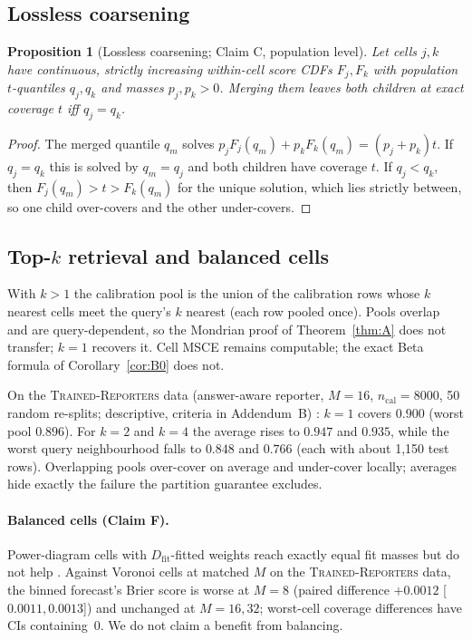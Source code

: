\documentclass[11pt]{article}
\newtheorem{proposition}[theorem]{Proposition}
\theoremstyle{definition}
\theoremstyle{remark}
\newcommand{\Dfit}{D_{\mathrm{fit}}}
\newcommand{\1}{\mathbf{1}}
\newcommand{\expname}[1]{\textsc{#1}}
\begin{document}
\subsection{Lossless coarsening}
\begin{proposition}[Lossless coarsening; Claim C, population level]
\label{prop:C}
Let cells $j,k$ have continuous, strictly increasing within-cell score CDFs $F_j,F_k$ with
population $t$-quantiles $q_j,q_k$ and masses $p_j,p_k>0$. Merging them leaves both
children at exact coverage $t$ iff $q_j=q_k$.
\end{proposition}
\begin{proof}
The merged quantile $q_m$ solves $p_jF_j(q_m)+p_kF_k(q_m)=(p_j+p_k)t$. If $q_j=q_k$ this
is solved by $q_m=q_j$ and both children have coverage $t$. If $q_j<q_k$, then
$F_j(q_m)>t>F_k(q_m)$ for the unique solution, which lies strictly between, so one child
over-covers and the other under-covers.
\end{proof}
\subsection{Top-$k$ retrieval and balanced cells}
\label{sec:topk}
With $k>1$ the calibration pool is the union of the calibration rows whose $k$ nearest cells
meet the query's $k$ nearest (each row pooled once). Pools overlap and are query-dependent, so
the Mondrian proof of Theorem~\ref{thm:A} does not transfer; $k=1$ recovers it. Cell MSCE
remains computable; the exact Beta formula of Corollary~\ref{cor:B0} does not.

On the \expname{Trained-Reporters} data (answer-aware reporter, $M=16$, $n_{\mathrm{cal}}=8000$, 50 random re-splits;
descriptive, criteria in Addendum~B) : $k=1$ covers $0.900$ (worst pool $0.896$). For
$k=2$ and $k=4$ the average rises to $0.947$ and $0.935$, while the worst query neighbourhood
falls to $0.848$ and $0.766$ (each with about 1{,}150 test rows). Overlapping pools over-cover
on average and under-cover locally; averages hide exactly the failure the partition guarantee
excludes.

\paragraph{Balanced cells (Claim F).} Power-diagram cells with $\Dfit$-fitted weights reach
exactly equal fit masses but do not help . Against Voronoi cells at matched $M$ on the \expname{Trained-Reporters}
data, the binned forecast's Brier score is worse at $M=8$ (paired difference $+0.0012$
[$0.0011,0.0013$]) and unchanged at $M=16,32$; worst-cell coverage differences have CIs
containing~0. We do not claim a benefit from balancing.
\end{document}
